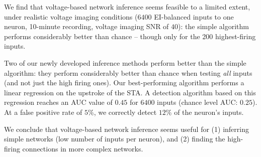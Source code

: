 We find that voltage-based network inference seems feasible to a limited extent, under realistic voltage imaging conditions ($6400$ EI-balanced inputs to one neuron, 10-minute
recording, voltage imaging SNR of $40$): the simple algorithm performs considerably better than chance -- though only for the 200 highest-firing inputs.

Two of our newly developed inference methods perform better than the simple algorithm: they perform considerably better than chance when testing \emph{all} inputs (and not just the high firing ones). Our best-performing algorithm performs a linear regression on the upstroke of the STA. A detection algorithm based on this regression reaches an AUC value of $0.45$ for $6400$ inputs (chance level AUC: $0.25$). At a false positive rate of $5$\%, we correctly detect $12$\% of the neuron's inputs.

We conclude that voltage-based network inference seems useful for (1) inferring simple networks (low number of inputs per neuron), and (2) finding the high-firing connections in more complex networks.
